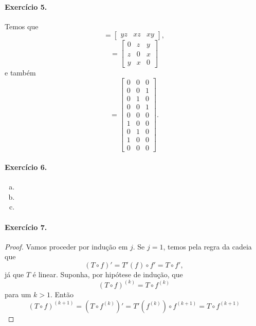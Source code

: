 \documentclass[12pt,a4paper]{article}
\begin{document}
\paragraph{Exercício 5.}
%
Temos que
%
\begin{equation*}
    [f'(x,y,z)] = 
    \begin{bmatrix}
        yz & xz & xy
    \end{bmatrix},
\end{equation*}
%
\begin{equation*}
    [f''(x,y,z)] =
    \begin{bmatrix}
        0 & z & y \\
        z & 0 & x \\
        y & x & 0
    \end{bmatrix}
\end{equation*}
%
e também
%
\begin{equation*}
    [f'''(x,y,z)] = 
    \begin{bmatrix}
        0 & 0 & 0 \\
        0 & 0 & 1 \\
        0 & 1 & 0 \\
        0 & 0 & 1 \\
        0 & 0 & 0 \\
        1 & 0 & 0 \\
        0 & 1 & 0 \\
        1 & 0 & 0 \\
        0 & 0 & 0
    \end{bmatrix}.
\end{equation*}
%
\paragraph{Exercício 6.}
%
\begin{enumerate}[a)]
    \item 
    \item
    \item
\end{enumerate}
%
\paragraph{Exercício 7.}
%
\begin{proof}
    Vamos proceder por indução em $j$. Se $j=1$, temos pela regra da cadeia que
    \begin{equation*}
        (T\circ f)' = T'(f)\circ f' = T\circ f',
    \end{equation*}
    já que $T$ é linear. Suponha, por hipótese de indução, que
    \begin{equation*}
        (T\circ f)^{(k)} = T\circ f^{(k)}
    \end{equation*}
    para um $k>1$. Então
    \begin{equation*}
        (T\circ f)^{(k+1)} = (T\circ f^{(k)})' = T'(f^{(k)})\circ f^{(k+1)} = T\circ f^{(k+1)}
    \end{equation*}
\end{proof}
%
\end{document}
